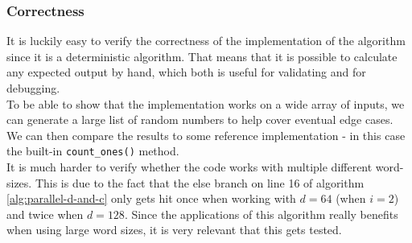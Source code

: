 \subsubsection{Correctness}
It is luckily easy to verify the correctness of the implementation of the algorithm since it is a deterministic algorithm. That means that it is possible to calculate any expected output by hand, which both is useful for validating and for debugging.\\
To be able to show that the implementation works on a wide array of inputs, we can generate a large list of random numbers to help cover eventual edge cases. We can then compare the results to some reference implementation - in this case the built-in \texttt{count\_ones()} method.\\
It is much harder to verify whether the code works with multiple different word-sizes. This is due to the fact that the else branch on line 16 of algorithm \ref{alg:parallel-d-and-c} only gets hit once when working with $d=64$ (when $i=2$) and twice when $d=128$. Since the applications of this algorithm really benefits when using large word sizes, it is very relevant that this gets tested.

